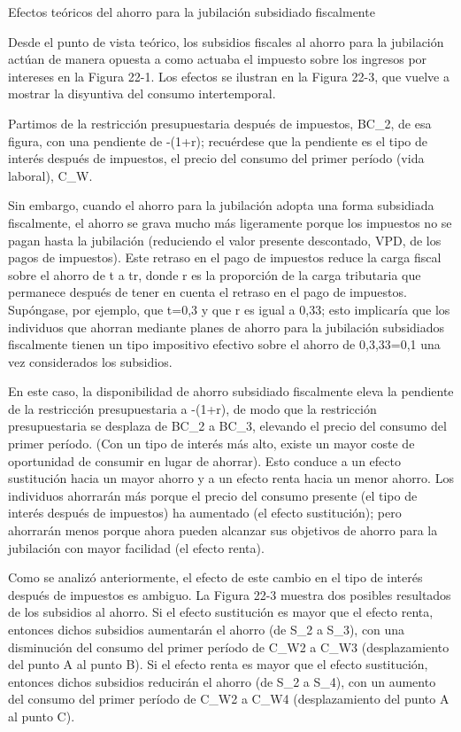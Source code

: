 \documentclass[10pt,a4paper]{article}
\begin{document}
Efectos teóricos del ahorro para la jubilación subsidiado fiscalmente

Desde el punto de vista teórico, los subsidios fiscales al ahorro para la jubilación actúan de manera opuesta a como actuaba el impuesto sobre los ingresos por intereses en la Figura 22-1. Los efectos se ilustran en la Figura 22-3, que vuelve a mostrar la disyuntiva del consumo intertemporal.

Partimos de la restricción presupuestaria después de impuestos, BC_2, de esa figura, con una pendiente de -(1+r\times[1-t]); recuérdese que la pendiente es el tipo de interés después de impuestos, el precio del consumo del primer período (vida laboral), C_W.

Sin embargo, cuando el ahorro para la jubilación adopta una forma subsidiada fiscalmente, el ahorro se grava mucho más ligeramente porque los impuestos no se pagan hasta la jubilación (reduciendo el valor presente descontado, VPD, de los pagos de impuestos). Este retraso en el pago de impuestos reduce la carga fiscal sobre el ahorro de t a t\times r, donde r es la proporción de la carga tributaria que permanece después de tener en cuenta el retraso en el pago de impuestos. Supóngase, por ejemplo, que t=0,3 y que r es igual a 0,33; esto implicaría que los individuos que ahorran mediante planes de ahorro para la jubilación subsidiados fiscalmente tienen un tipo impositivo efectivo sobre el ahorro de 0,3,33=0,1 una vez considerados los subsidios.

En este caso, la disponibilidad de ahorro subsidiado fiscalmente eleva la pendiente de la restricción presupuestaria a -(1+r\times[1-t\times r]), de modo que la restricción presupuestaria se desplaza de BC_2 a BC_3, elevando el precio del consumo del primer período. (Con un tipo de interés más alto, existe un mayor coste de oportunidad de consumir en lugar de ahorrar). Esto conduce a un efecto sustitución hacia un mayor ahorro y a un efecto renta hacia un menor ahorro. Los individuos ahorrarán más porque el precio del consumo presente (el tipo de interés después de impuestos) ha aumentado (el efecto sustitución); pero ahorrarán menos porque ahora pueden alcanzar sus objetivos de ahorro para la jubilación con mayor facilidad (el efecto renta).

Como se analizó anteriormente, el efecto de este cambio en el tipo de interés después de impuestos es ambiguo. La Figura 22-3 muestra dos posibles resultados de los subsidios al ahorro. Si el efecto sustitución es mayor que el efecto renta, entonces dichos subsidios aumentarán el ahorro (de S_2 a S_3), con una disminución del consumo del primer período de C_{W2} a C_{W3} (desplazamiento del punto A al punto B). Si el efecto renta es mayor que el efecto sustitución, entonces dichos subsidios reducirán el ahorro (de S_2 a S_4), con un aumento del consumo del primer período de C_{W2} a C_{W4} (desplazamiento del punto A al punto C).
\end{document}
